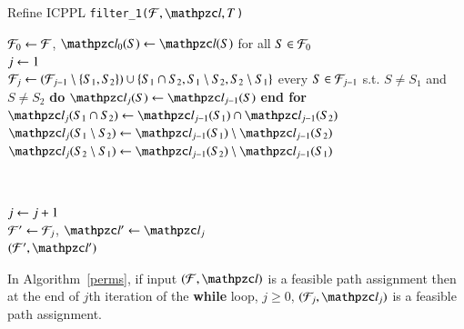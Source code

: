 \documentclass[MS,]{iitmdiss}
\begin{document}
\begin{algorithm}[h]
  \caption{Refine ICPPL {\tt filter\_1($\cF, \cl, T$)}}
  \label{perms}
  \begin{algorithmic}[\lndisplay]
    \STATE ${\cal F}_0 \leftarrow {\cal F}$, $\cl_0(S) \assign \cl(S)$ for all $S \in {\cal F}_0$\\
    \STATE $j \leftarrow 1$\\
    \label{shareleaf} \STATE ${\cal F}_j \leftarrow ({\cal F}_{j-1} \setminus
    \{S_1, S_2\})
    \cup \{S_1 \cap S_2, S_1 \setminus S_2, S_2 \setminus S_1 \}$ \label{setbreak} 
     every $S \in {\cal F}_{j-1}$ s.t. $S \ne S_1$ and $S \ne
    S_2$ {\bf do} $\cl_j(S) \assign \cl_{j-1}(S)$ {\bf end for}\\

    \STATE $\cl_j(S_1 \cap S_2) \assign \cl_{j-1}(S_1) \cap
    \cl_{j-1}(S_2)$
    \STATE $\cl_j(S_1 \setminus S_2) \assign \cl_{j-1}(S_1) \setminus
    \cl_{j-1}(S_2)$ 
    \STATE $\cl_j(S_2 \setminus S_1) \assign \cl_{j-1}(S_2) \setminus
    \cl_{j-1}(S_1)$

    \label{ln:3waycheck}
     \label{ln:exit1} \\
    \ENDIF

    \STATE $j \leftarrow j+1$\\
    \ENDWHILE
    \STATE ${\cal F}' \leftarrow {\cal F}_j$, $\cl' \assign \cl_j$\\
    \RETURN $(\cF', \cl')$
  \end{algorithmic}
\end{algorithm}

\begin{lemma} 
 \label{lem:feasible} 
 In Algorithm~\ref{perms}, if input $(\cF, \cl)$ is a feasible path
 assignment then at the end of $j$th iteration of the {\bf while}
 loop, $j \ge 0$, $(\cF_j, \cl_j)$ is a feasible path assignment.
\end{lemma}
\end{document}
